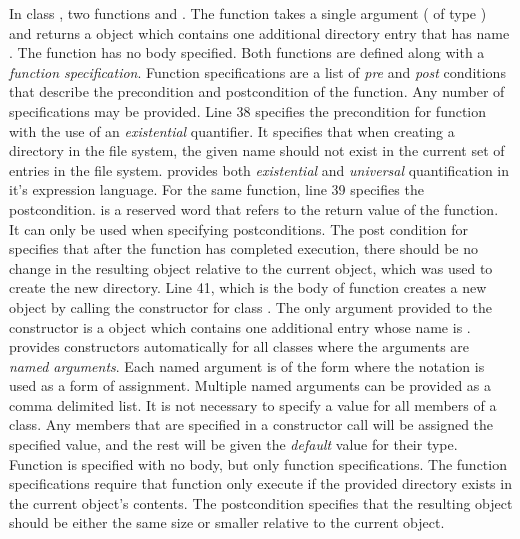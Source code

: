 In class , two functions  and
. The  function takes a single argument
( of type ) and returns a 
object which contains one additional directory entry that has name
. The  function has no body specified. Both
functions are defined along with a {\em function
  specification}. Function specifications are a list of {\em pre} and
{\em post} conditions that describe the precondition and postcondition
of the function. Any number of specifications may be provided. Line 38
specifies the precondition for function  with the use of
an {\em existential} quantifier. It specifies that when creating a
directory in the file system, the given name  should not exist
in the current set of entries in the file system. \Klang{} provides
both {\em existential} and {\em universal} quantification in it's
expression language. For the same function, line 39 specifies the
postcondition.  is a reserved word that refers to the
return value of the function. It can only be used when specifying
postconditions. The post condition for  specifies that
after the function  has completed execution, there should
be no change in the resulting  object relative to the
current  object, which was used to create the new
directory. Line 41, which is the body of function  creates
a new  object by calling the constructor for class
. The only argument provided to the constructor is a
 object which contains one additional  entry whose
name is . \Klang{} provides constructors automatically for all
classes where the arguments are {\em named arguments}. Each named
argument is of the form  where the \code{::}
notation is used as a form of assignment. Multiple named arguments can
be provided as a comma delimited list. It is not necessary to specify
a value for all members of a class. Any members that are specified in
a constructor call will be assigned the specified value, and the rest
will be given the {\em default} value for their type. Function
 is specified with no body, but only function
specifications. The function specifications require that function
 only execute if the provided directory  exists in
the current object's contents. The postcondition specifies that the
resulting  object should be either the same size or
smaller relative to the current object.

